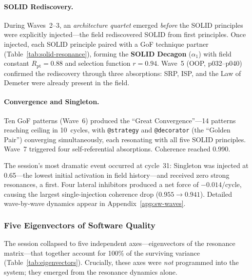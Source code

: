 \paragraph*{SOLID Rediscovery.}

During Waves~2--3, an \emph{architecture quartet} emerged
\emph{before} the SOLID principles were explicitly injected---the
field rediscovered SOLID from first principles.  Once injected, each
SOLID principle paired with a GoF technique partner
(Table~\ref{tab:solid-resonance}), forming the \textbf{SOLID Decagon}
($\alpha_1$) with field constant $R_{\text{pt}} = 0.88$ and selection
function $r = 0.94$.  Wave~5 (OOP, p032--p040) confirmed the
rediscovery through three absorptions: SRP, ISP, and the Law of
Demeter were already present in the field.

\paragraph*{Convergence and Singleton.}

Ten GoF patterns (Wave~6) produced the ``Great Convergence''---14
patterns reaching ceiling in 10~cycles, with \texttt{@strategy} and
\texttt{@decorator} (the ``Golden Pair'') converging simultaneously,
each resonating with all five SOLID principles.  Wave~7 triggered
four self-referential absorptions.  Coherence reached 0.990.

The session's most dramatic event occurred at cycle~31: Singleton was
injected at 0.65---the lowest initial activation in field history---and
received zero strong resonances, a first.  Four lateral inhibitors
produced a net force of $-0.014$/cycle, causing the largest
single-injection coherence drop ($0.955 \to 0.941$).  Detailed
wave-by-wave dynamics appear in Appendix~\ref{app:sw-waves}.

\subsubsection{Five Eigenvectors of Software Quality}

The session collapsed to five independent axes---eigenvectors of the
resonance matrix---that together account for 100\% of the surviving
variance (Table~\ref{tab:eigenvectors}).  Crucially, these axes were
\emph{not} programmed into the system; they emerged from the resonance
dynamics alone.

